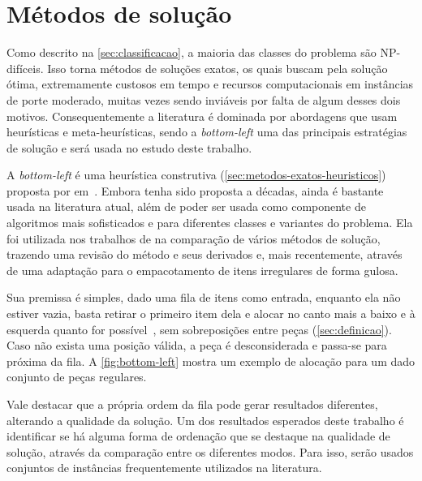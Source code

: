 \chapter{Métodos de solução}\label{ch:bottom-left}

Como descrito na \autoref{sec:classificacao}, a maioria das classes do problema são NP-difíceis.
Isso torna métodos de soluções exatos, os quais buscam pela solução ótima, extremamente custosos
em tempo e recursos computacionais em instâncias de porte moderado, muitas vezes sendo inviáveis
por falta de algum desses dois motivos.
Consequentemente a literatura é dominada por abordagens que usam heurísticas e meta-heurísticas,
sendo a \textit{bottom-left} uma das principais estratégias de solução e será usada no estudo
deste trabalho.

A \textit{bottom-left} é uma heurística construtiva (\cref{sec:metodos-exatos-heuristicos}) proposta
por \citeauthor*{baker1980orthogonal} em~\citeyear*{baker1980orthogonal}.
Embora tenha sido proposta a décadas, ainda é bastante usada na literatura atual, além de poder
ser usada como componente de algoritmos mais sofisticados e para diferentes classes e variantes
do problema.
Ela foi utilizada nos trabalhos de  na comparação de vários
métodos de solução,  trazendo uma revisão do método e seus derivados
e, mais recentemente,  através de uma adaptação para o
empacotamento de itens irregulares de forma gulosa.

Sua premissa é simples, dado uma fila de itens como entrada, enquanto ela não estiver vazia,
basta retirar o primeiro item dela e alocar no canto mais a baixo e à esquerda quanto for
possível~\cite{aprendizado-reforco}, sem sobreposições entre peças (\autoref{sec:definicao}).
Caso não exista uma posição válida, a peça é desconsiderada e passa-se para próxima da fila.
A \autoref{fig:bottom-left} mostra um exemplo de alocação para um dado conjunto de peças regulares.



Vale destacar que a própria ordem da fila pode gerar resultados diferentes, alterando a qualidade
da solução.
Um dos resultados esperados deste trabalho é identificar se há alguma forma de ordenação que
se destaque na qualidade de solução, através da comparação entre os diferentes modos.
Para isso, serão usados conjuntos de instâncias frequentemente utilizados na literatura.



